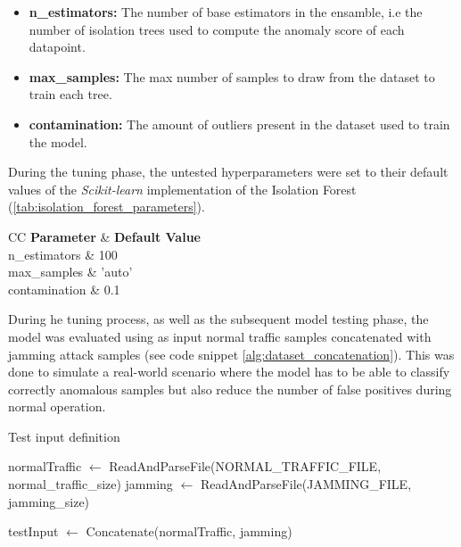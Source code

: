 \documentclass[futureinternet,article,submit,pdftex,moreauthors]{Definitions/mdpi}
\begin{document}
\begin{itemize}
	\item \textbf{n\_estimators:} The number of base estimators in the ensamble, i.e the number of isolation trees used to compute the anomaly score of each datapoint. 
	\item \textbf{max\_samples:} The max number of samples to draw from the dataset to train each tree.
	\item \textbf{contamination:} The amount of outliers present in the dataset used to train the model. 
\end{itemize}

During the tuning phase, the untested hyperparameters were set to their default values of the \textit{Scikit-learn} implementation of the Isolation Forest (\ref{tab:isolation_forest_parameters}).

\begin{table}[H]
	\caption{Scikit-Learn Isolation Forest hyperparameters default values.\label{tab:isolation_forest_parameters}}
	\begin{tabularx}{\textwidth}{CC}
	\toprule
	\textbf{Parameter} & \textbf{Default Value} \\
	\midrule
	n\_estimators & 100 \\
	max\_samples & 'auto' \\
	contamination & 0.1 \\
	\bottomrule
	\end{tabularx}
\end{table}

During he tuning process, as well as the subsequent model testing phase, the model was evaluated using as input normal traffic samples concatenated with jamming attack samples (see code snippet \ref{alg:dataset_concatenation}). 
This was done to simulate a real-world scenario where the model has to be able to classify correctly anomalous samples but also reduce the number of false positives during normal operation. 

\begin{algorithm}
	\caption{Test input definition}\label{alg:dataset_concatenation}
	\begin{algorithmic}[1]
	\State normalTraffic $\gets$ ReadAndParseFile(NORMAL\_TRAFFIC\_FILE, normal\_traffic\_size)
	\State jamming $\gets$ ReadAndParseFile(JAMMING\_FILE, jamming\_size)

	\State testInput $\gets$ Concatenate(normalTraffic, jamming)
	\end{algorithmic}
\end{algorithm}
\end{document}
